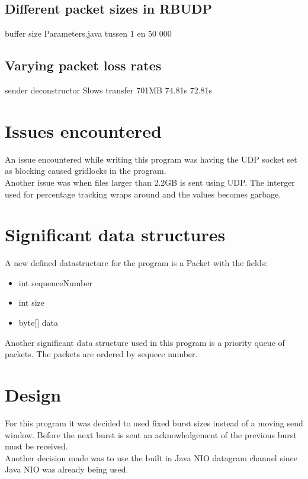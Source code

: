 \documentclass[a4paper,10pt]{article}
\begin{document}
\subsection{Different packet sizes in RBUDP}
buffer size Parameters.java tussen 1 en 50 000

\subsection{Varying packet loss rates}
sender deconstructor
Slows transfer
701MB
74.81s
72.81s

\section{Issues encountered}
An issue encountered while writing this program was having the UDP socket set
as blocking caused gridlocks in the program.\\
Another issue was when files larger than 2.2GB is sent using UDP. The interger
used for percentage tracking wraps around and the values becomes garbage.

\section{Significant data structures}
A new defined datastructure for the program is a Packet with the fields:
\begin{itemize}
	\item int sequenceNumber
	\item int size
	\item byte[] data
\end{itemize}
Another significant data structure used in this program is a priority queue of
packets. The packets are ordered by sequece number.

\section{Design}
For this program it was decided to used fixed burst sizes instead of a moving
send window. Before the next burst is sent an acknowledgement of the previous
burst must be received.\\
Another decision made was to use the built in Java NIO datagram channel since
Java NIO was already being used.
\end{document}
